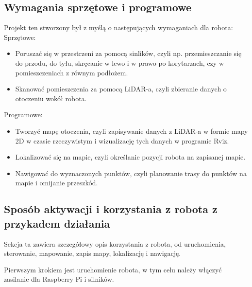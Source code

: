 \documentclass[a4paper,twoside,12pt]{book}
\begin{document}
\subsection{Wymagania sprzętowe i programowe}
Projekt ten stworzony był z myślą o następujących wymaganiach dla robota:
\newline\newline
Sprzętowe:
\begin{itemize}
	\item Poruszać się w przestrzeni za pomocą sinlików, czyli np. przemieszczanie się do przodu, do tyłu, skręcanie w lewo i w prawo po korytarzach, czy w pomieszczeniach z równym podłożem.
	\item Skanować pomieszczenia za pomocą LiDAR-a, czyli zbieranie danych o otoczeniu wokół robota.
	\end{itemize}
Programowe:
\begin{itemize}
	\item Tworzyć mapę otoczenia, czyli zapisywanie danych z LiDAR-a w formie mapy 2D w czasie rzeczywistym i wizualizację tych danych w programie Rviz.
	\item Lokalizować się na mapie, czyli określanie pozycji robota na zapisanej mapie.
	\item Nawigować do wyznaczonych punktów, czyli planowanie trasy do punktów na mapie i omijanie przeszkód.
\end{itemize}
\newpage

\subsection{Sposób aktywacji i korzystania z robota z przykadem działania}
Sekcja ta zawiera szczegółowy opis korzystania z robota, od uruchomienia, sterowanie, mapowanie, zapis mapy, lokalizację i nawigację.

Pierwszym krokiem jest uruchomienie robota, w tym celu należy włączyć zasilanie dla Raspberry Pi i silników.
\end{document}
